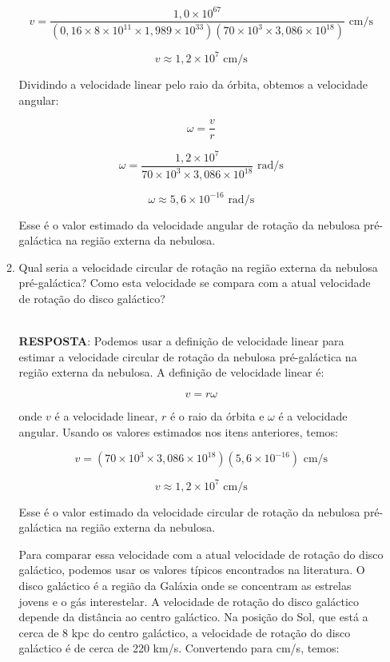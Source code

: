 \documentclass[a4paper,12pt]{article}
\begin{document}
\begin{enumerate}
\begin{enumerate}
$$v = \frac{1,0 \times 10^{67}}{(0,16 \times 8 \times 10^{11} \times 1,989 \times 10^{33})(70 \times 10^3 \times 3,086 \times 10^{18})} \text{ cm/s}$$

$$v \approx 1,2 \times 10^7 \text{ cm/s}$$

Dividindo a velocidade linear pelo raio da órbita, obtemos a velocidade angular:

$$\omega = \frac{v}{r}$$

$$\omega = \frac{1,2 \times 10^7}{70 \times 10^3 \times 3,086 \times 10^{18}} \text{ rad/s}$$

$$\omega \approx 5,6 \times 10^{-16} \text{ rad/s}$$

Esse é o valor estimado da velocidade angular de rotação da nebulosa pré-galáctica na região externa da nebulosa.

\noindent\hrulefill

\item Qual seria a velocidade circular de rotação na região externa da nebulosa pré-galáctica? Como esta velocidade se compara com a atual velocidade de rotação do disco galáctico?

\noindent\hrulefill\\\textbf{RESPOSTA}: Podemos usar a definição de velocidade linear para estimar a velocidade circular de rotação da nebulosa pré-galáctica na região externa da nebulosa. A definição de velocidade linear é:

$$v = r\omega$$

onde $v$ é a velocidade linear, $r$ é o raio da órbita e $\omega$ é a velocidade angular. Usando os valores estimados nos itens anteriores, temos:


$$v = (70 \times 10^3 \times 3,086 \times 10^{18})(5,6 \times 10^{-16}) \text{ cm/s}$$

$$v \approx 1,2 \times 10^7 \text{ cm/s}$$

Esse é o valor estimado da velocidade circular de rotação da nebulosa pré-galáctica na região externa da nebulosa.

Para comparar essa velocidade com a atual velocidade de rotação do disco galáctico, podemos usar os valores típicos encontrados na literatura. O disco galáctico é a região da Galáxia onde se concentram as estrelas jovens e o gás interestelar. A velocidade de rotação do disco galáctico depende da distância ao centro galáctico. Na posição do Sol, que está a cerca de 8 kpc do centro galáctico, a velocidade de rotação do disco galáctico é de cerca de 220 km/s. Convertendo para cm/s, temos:


\end{enumerate}
\end{enumerate}
\end{document}
